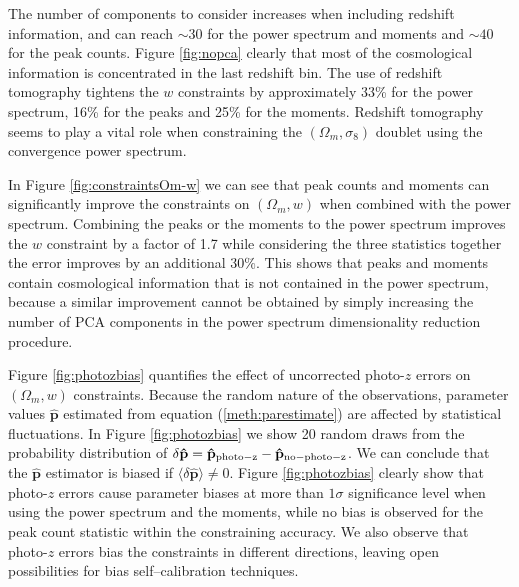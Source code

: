 \documentclass[reprint,aps,prd,superscriptaddress,showkeys,showpacs]{revtex4-1}
\newcommand{\bbh}[1]{\mathbf{\hat{#1}}}
\begin{document}
The number of components to consider increases when including redshift information, and can reach $\sim 30$ for the power spectrum and moments and $\sim 40$ for the peak counts. Figure \ref{fig:nopca} clearly that most of the cosmological information is concentrated in the last redshift bin. The use of redshift tomography tightens the $w$ constraints by approximately 33\% for the power spectrum, 16\% for the peaks and 25\% for the moments. Redshift tomography seems to play a vital role when constraining the $(\Omega_m,\sigma_8)$ doublet using the convergence power spectrum.   

In Figure \ref{fig:constraintsOm-w} we can see that peak counts and moments can significantly improve the constraints on $(\Omega_m,w)$ when combined with the power spectrum. Combining the peaks or the moments to the power spectrum improves the $w$ constraint by a factor of 1.7 while considering the three statistics together the error improves by an additional $30\%$. This shows that peaks and moments contain cosmological information that is not contained in the power spectrum, because a similar improvement cannot be obtained by simply increasing the number of PCA components in the power spectrum dimensionality reduction procedure. 

Figure \ref{fig:photozbias} quantifies the effect of uncorrected photo-$z$ errors on $(\Omega_m,w)$ constraints. Because the random nature of the observations, parameter values $\bbh{p}$ estimated from equation (\ref{meth:parestimate}) are affected by statistical fluctuations. In Figure \ref{fig:photozbias} we show 20 random draws from the probability distribution of $\delta \bbh{p}=\bbh{p}_{\rm photo-z}-\bbh{p}_{\rm no-photo-z}$. We can conclude that the $\bbh{p}$ estimator is biased if $\langle\delta\bbh{p}\rangle\neq 0$. Figure \ref{fig:photozbias} clearly show that photo-$z$ errors cause parameter biases at more than $1\sigma$ significance level when using the power spectrum and the moments, while no bias is observed for the peak count statistic within the constraining accuracy. We also observe that photo-$z$ errors bias the constraints in different directions, leaving open possibilities for bias self--calibration techniques.         

\end{document}
